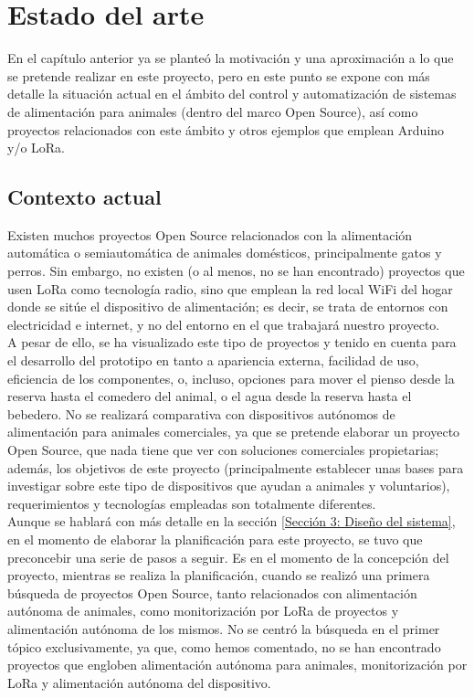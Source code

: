 \documentclass[12pt]{article}
\begin{document}
	\pagebreak
	

	\section[Estado del arte]{Estado del arte}  
	
	\noindent En el capítulo anterior ya se planteó la motivación y una aproximación a lo que se pretende realizar en este proyecto, pero en este punto se expone con más detalle la situación actual en el ámbito del control y automatización de sistemas de alimentación para animales (dentro del marco Open Source), así como proyectos relacionados con este ámbito y otros ejemplos que emplean Arduino y/o LoRa.
	
	\subsection[Contexto actual]{Contexto actual}
		
	\noindent Existen muchos proyectos Open Source relacionados con la alimentación automática o semiautomática de animales domésticos, principalmente gatos y perros. Sin embargo, no existen (o al menos, no se han encontrado) proyectos que usen LoRa como tecnología radio, sino que emplean la red local WiFi del hogar donde se sitúe el dispositivo de alimentación; es decir, se trata de entornos con electricidad e internet, y no del entorno en el que trabajará nuestro proyecto. \\
	
	\noindent A pesar de ello, se ha visualizado este tipo de proyectos y tenido en cuenta para el desarrollo del prototipo en tanto a apariencia externa, facilidad de uso, eficiencia de los componentes, o, incluso, opciones para mover el pienso desde la reserva hasta el comedero del animal, o el agua desde la reserva hasta el bebedero. No se realizará comparativa con dispositivos autónomos de alimentación para animales comerciales, ya que se pretende elaborar un proyecto Open Source, que nada tiene que ver con soluciones comerciales propietarias; además, los objetivos de este proyecto (principalmente establecer unas bases para investigar sobre este tipo de dispositivos que ayudan a animales y voluntarios), requerimientos y tecnologías empleadas son totalmente diferentes. \\
	
	\noindent Aunque se hablará con más detalle en la sección \ref{Sección 3: Diseño del sistema}, en el momento de elaborar la planificación para este proyecto, se tuvo que preconcebir una serie de pasos a seguir. Es en el momento de la concepción del proyecto, mientras se realiza la planificación, cuando se realizó una primera búsqueda de proyectos Open Source, tanto relacionados con alimentación autónoma de animales, como monitorización por LoRa de proyectos y alimentación autónoma de los mismos. No se centró la búsqueda en el primer tópico exclusivamente, ya que, como hemos comentado, no se han encontrado proyectos que engloben alimentación autónoma para animales, monitorización por LoRa y alimentación autónoma del dispositivo.\\
	
\end{document}

